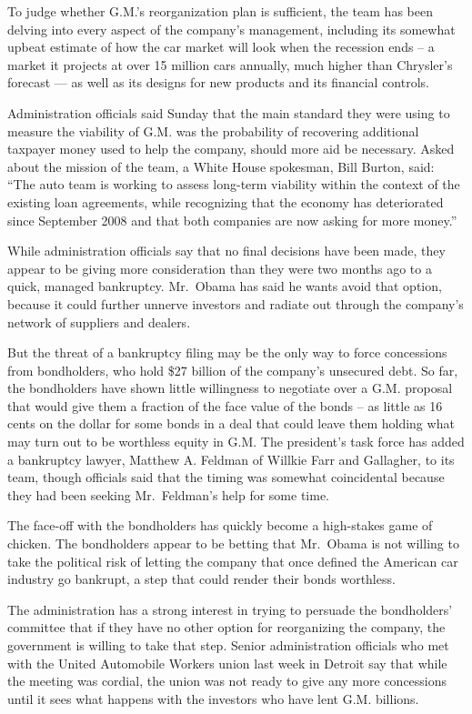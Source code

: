 \documentclass[12pt,a4paper,onecolumn]{article}
\begin{document}
\begin{CJK*}{GBK}{song}
To judge whether G.M.'s reorganization plan is sufficient, the team has been delving into every
aspect of the company's management, including its somewhat upbeat estimate of how the car market
will look when the recession ends -- a market it projects at over 15 million cars annually, much
higher than Chrysler's forecast — as well as its designs for new products and its financial
controls.

Administration officials said Sunday that the main standard they were using to measure the viability
of G.M. was the probability of recovering additional taxpayer money used to help the company, should
more aid be necessary. Asked about the mission of the team, a White House spokesman, Bill Burton,
said: ``The auto team is working to assess long-term viability within the context of the existing
loan agreements, while recognizing that the economy has deteriorated since September 2008 and that
both companies are now asking for more money.''

While administration officials say that no final decisions have been made, they appear to be giving
more consideration than they were two months ago to a quick, managed bankruptcy. Mr.~Obama has said
he wants avoid that option, because it could further unnerve investors and radiate out through the
company's network of suppliers and dealers.

But the threat of a bankruptcy filing may be the only way to force concessions from bondholders, who
hold \$27 billion of the company's unsecured debt. So far, the bondholders have shown little
willingness to negotiate over a G.M. proposal that would give them a fraction of the face value of
the bonds -- as little as 16 cents on the dollar for some bonds in a deal that could leave them
holding what may turn out to be worthless equity in G.M. The president's task force has added a
bankruptcy lawyer, Matthew A. Feldman of Willkie Farr and Gallagher, to its team, though officials
said that the timing was somewhat coincidental because they had been seeking Mr.~Feldman's help for
some time.

The face-off with the bondholders has quickly become a high-stakes game of chicken. The bondholders
appear to be betting that Mr.~Obama is not willing to take the political risk of letting the company
that once defined the American car industry go bankrupt, a step that could render their bonds
worthless.

The administration has a strong interest in trying to persuade the bondholders' committee that if
they have no other option for reorganizing the company, the government is willing to take that step.
Senior administration officials who met with the United Automobile Workers union last week in
Detroit say that while the meeting was cordial, the union was not ready to give any more concessions
until it sees what happens with the investors who have lent G.M. billions.


\end{CJK*}
\end{document}
